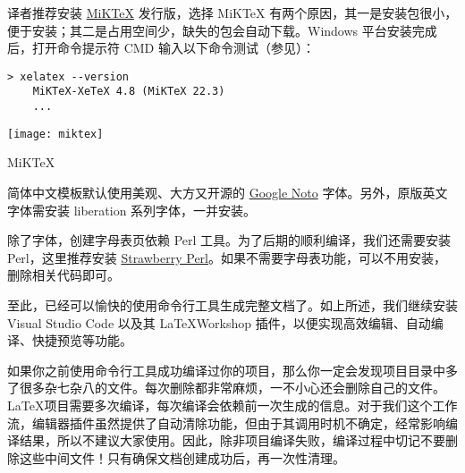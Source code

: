 译者推荐安装 \href{https://miktex.org/}{MiKTeX} 发行版，选择 MiKTeX 有两个原因，其一是安装包很小，便于安装；其二是占用空间少，缺失的包会自动下载。Windows 平台安装完成后，打开命令提示符 CMD 输入以下命令测试（参见）：

\begin{lstlisting}[style=kaolstplain]
	> xelatex --version
	MiKTeX-XeTeX 4.8 (MiKTeX 22.3)
	...
\end{lstlisting}

\begin{marginfigure}
	\texttt{[image: miktex]}
	\caption[MiKTeX]{MiKTeX}
\end{marginfigure}

简体中文模板默认使用美观、大方又开源的 \href{https://github.com/googlefonts/noto-cjk}{Google Noto} 字体。另外，原版英文字体需安装 liberation 系列字体，一并安装。

除了字体，创建字母表页依赖 Perl 工具。为了后期的顺利编译，我们还需要安装 Perl，这里推荐安装 \href{https://strawberryperl.com/}{Strawberry Perl}。如果不需要字母表功能，可以不用安装，删除相关代码即可。

至此，已经可以愉快的使用命令行工具生成完整文档了。如上所述，我们继续安装 Visual Studio Code 以及其 \LaTeX Workshop 插件，以便实现高效编辑、自动编译、快捷预览等功能。

如果你之前使用命令行工具成功编译过你的项目，那么你一定会发现项目目录中多了很多杂七杂八的文件。每次删除都非常麻烦，一不小心还会删除自己的文件。\LaTeX 项目需要多次编译，每次编译会依赖前一次生成的信息。对于我们这个工作流，编辑器插件虽然提供了自动清除功能，但由于其调用时机不确定，经常影响编译结果，所以不建议大家使用。因此，除非项目编译失败，编译过程中切记不要删除这些中间文件！只有确保文档创建成功后，再一次性清理。
